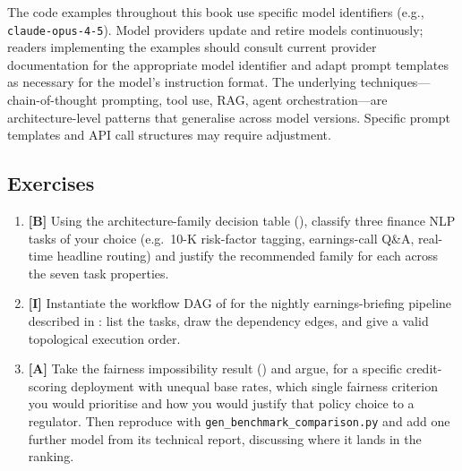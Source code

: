\begin{remark}
The code examples throughout this book use specific model identifiers (e.g., \texttt{claude-opus-4-5}). Model providers update and retire models continuously; readers implementing the examples should consult current provider documentation for the appropriate model identifier and adapt prompt templates as necessary for the model's instruction format. The underlying techniques---chain-of-thought prompting, tool use, RAG, agent orchestration---are architecture-level patterns that generalise across model versions. Specific prompt templates and API call structures may require adjustment.
\end{remark}

\subsection*{Exercises}

\begin{enumerate}
  \item \textbf{[B]} Using the architecture-family decision table (),
        classify three finance NLP tasks of your choice (e.g.\ 10-K risk-factor tagging,
        earnings-call Q\&A, real-time headline routing) and justify the recommended family
        for each across the seven task properties.
  \item \textbf{[I]} Instantiate the workflow DAG of  for the
        nightly earnings-briefing pipeline described in : list the
        tasks, draw the dependency edges, and give a valid topological execution order.
  \item \textbf{[A]} Take the fairness impossibility result ()
        and argue, for a specific credit-scoring deployment with unequal base rates, which
        single fairness criterion you would prioritise and how you would justify that policy
        choice to a regulator. Then reproduce  with
        \texttt{gen\_benchmark\_comparison.py} and add one further model from its technical
        report, discussing where it lands in the ranking.
\end{enumerate}

